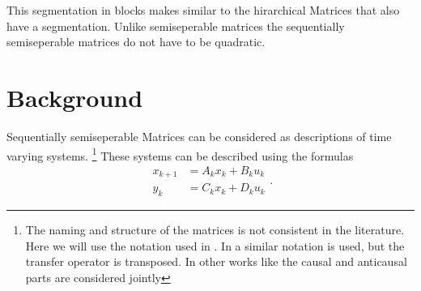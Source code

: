 \documentclass[doctype=mastersthesis,BCOR=15mm,biblatex]{ldvbook}%
\begin{document}
This segmentation in blocks makes similar to the hirarchical Matrices that also have a segmentation.
Unlike semiseperable matrices the sequentially semiseperable matrices do not have to be quadratic. 

\chapter{Background}\label{chap:background}


Sequentially semiseperable Matrices can be considered as descriptions of time varying systems.
\footnote{
The naming and structure of the matrices is not consistent in the literature.
Here we will use the notation used in \cite{tong_blind_2003}. 
In \cite{dewilde_time-varying_1998} a similar notation is used, but the transfer operator is transposed.
In other works like \cite{rice_efficient_2010,chandrasekaran_fast_2002} the causal and anticausal parts are considered jointly
}
These systems can be described using the formulas
\begin{subequations}
	\begin{align}
	x_{k+1} &= A_k x_k + B_k u_k \\
	y_k &= C_k x_k + D_k u_k 
	\end{align}.
	\label{eq:def_causal}
\end{subequations}
\end{document}

